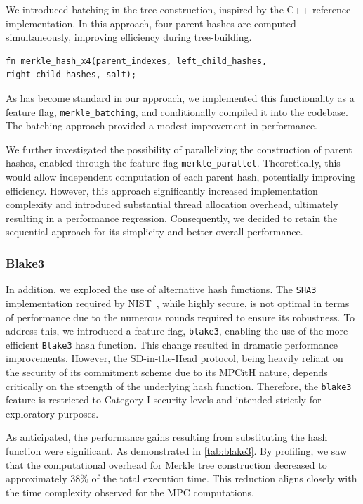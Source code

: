 \documentclass[11pt]{report}
\theoremstyle{definition}
\theoremstyle{plain}
\begin{document}
We introduced batching in the tree construction, inspired by the C++ reference implementation. In this approach, four parent hashes are computed simultaneously, improving efficiency during tree-building.

\begin{verbatim}
fn merkle_hash_x4(parent_indexes, left_child_hashes, right_child_hashes, salt);
\end{verbatim}

As has become standard in our approach, we implemented this functionality as a feature flag, \texttt{merkle\_batching}, and conditionally compiled it into the codebase. The batching approach provided a modest improvement in performance.

We further investigated the possibility of parallelizing the construction of parent hashes, enabled through the feature flag \texttt{merkle\_parallel}. Theoretically, this would allow independent computation of each parent hash, potentially improving efficiency. However, this approach significantly increased implementation complexity and introduced substantial thread allocation overhead, ultimately resulting in a performance regression. Consequently, we decided to retain the sequential approach for its simplicity and better overall performance.

\subsubsection*{Blake3}\label{sub:blake3}

In addition, we explored the use of alternative hash functions. The \texttt{SHA3} implementation required by NIST~\cite{nistcall}, while highly secure, is not optimal in terms of performance due to the numerous rounds required to ensure its robustness. To address this, we introduced a feature flag, \texttt{blake3}, enabling the use of the more efficient \texttt{Blake3} hash function. This change resulted in dramatic performance improvements. However, the SD-in-the-Head protocol, being heavily reliant on the security of its commitment scheme due to its MPCitH nature, depends critically on the strength of the underlying hash function. Therefore, the \texttt{blake3} feature is restricted to Category I security levels and intended strictly for exploratory purposes.

As anticipated, the performance gains resulting from substituting the hash function were significant. As demonstrated in \autoref{tab:blake3}. By profiling, we saw that the computational overhead for Merkle tree construction decreased to approximately $38\%$ of the total execution time. This reduction aligns closely with the time complexity observed for the MPC computations.
\end{document}
